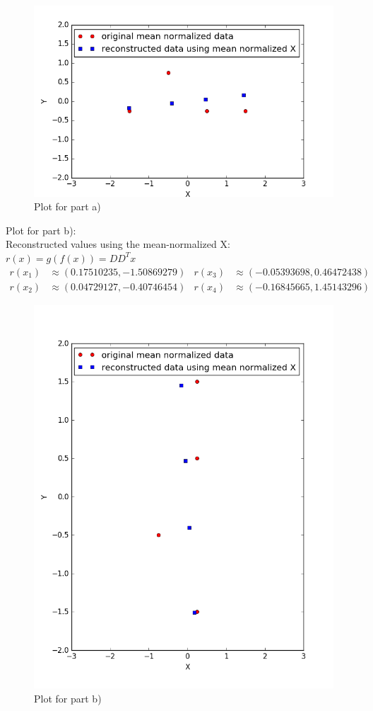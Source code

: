 \documentclass{article}
\begin{document}
\begin{figure}[ht]
	\centering
	\includegraphics[scale=0.4]{pca_a.png}
	\caption{Plot for part a)}
	\label{fig1}
\end{figure}

Plot for part b):\\
Reconstructed values using the mean-normalized X: $r(x) = g(f(x)) = DD^T x$ \\
\begin{align*}
r(x_1) &\approx (0.17510235, -1.50869279) & r(x_3) &\approx (-0.05393698, 0.46472438)\\ 
r(x_2) &\approx (0.04729127, -0.40746454) & r(x_4) &\approx (-0.16845665, 1.45143296)
\end{align*}

\begin{figure}[ht]
	\centering
	\includegraphics[scale=0.4]{pca_b.png}
	\caption{Plot for part b)}
	\label{fig2}
\end{figure}
\end{document}
